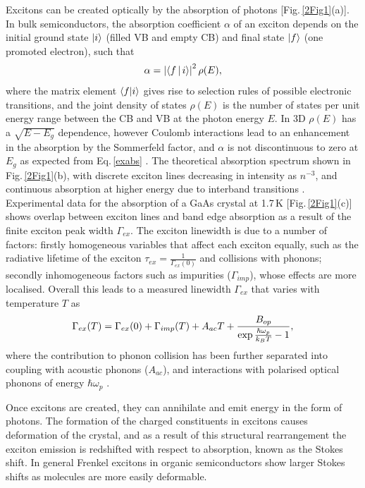 Excitons can be created optically by the absorption of photons [Fig.\,\ref{2Fig1}(a)]. In bulk semiconductors, the absorption coefficient $\alpha$ of an exciton depends on the initial ground state $\ket{i}$ (filled VB and empty CB) and final state $\ket{f}$ (one promoted electron), such that
\begin{equation}
\centering
\alpha = \left| \Braket{f | i} \right|^2 \rho(E) ,
\label{exabs}
\end{equation}
where the matrix element $\braket{f | i}$ gives rise to selection rules of possible electronic transitions, and the joint density of states $\rho(E)$ is the number of states per unit energy range between the CB and VB at the photon energy $E$. In 3D $\rho(E)$ has a $\sqrt{E-E_g}$ dependence, however Coulomb interactions lead to an enhancement in the absorption by the Sommerfeld factor, and $\alpha$ is not discontinuous to zero at $E_g$ as expected from Eq.\,\ref{exabs} \cite{Bassu1997}. The theoretical absorption spectrum shown in Fig.\,\ref{2Fig1}(b), with discrete exciton lines decreasing in intensity as $n^{-3}$, and continuous absorption at higher energy due to interband transitions \cite{Bassu1997}. Experimental data for the absorption of a GaAs crystal at 1.7\,K [Fig.\,\ref{2Fig1}(c)] shows overlap between exciton lines and band edge absorption as a result of the finite exciton peak width $\Gamma_{ex}$. The exciton linewidth is due to a number of factors: firstly homogeneous variables that affect each exciton equally, such as the radiative lifetime of the exciton $\tau_{ex} = \frac{1}{\Gamma_{ex}(0)}$ and collisions with phonons; secondly inhomogeneous factors such as impurities ($\Gamma_{imp}$), whose effects are more localised. Overall this leads to a measured linewidth $\Gamma_{ex}$ that varies with temperature $T$ as
\begin{equation}
\centering
\Gamma_{ex}(T) = \Gamma_{ex}(0) +  \Gamma_{imp}(T) +A_{ac}T + \frac{B_{op}}{\exp{\frac{\hbar\omega_p}{k_B T}}-1},
\label{exwidth}
\end{equation}
where the contribution to phonon collision has been further separated into coupling with acoustic phonons ($A_{ac}$), and interactions with polarised optical phonons of energy $\hbar\omega_p$ \cite{Dammak2009}. 

Once excitons are created, they can annihilate and emit energy in the form of photons. The formation of the charged constituents in excitons causes deformation of the crystal, and as a result of this structural rearrangement the exciton emission is redshifted with respect to absorption, known as the Stokes shift. In general Frenkel excitons in organic semiconductors show larger Stokes shifts as molecules are more easily deformable.

